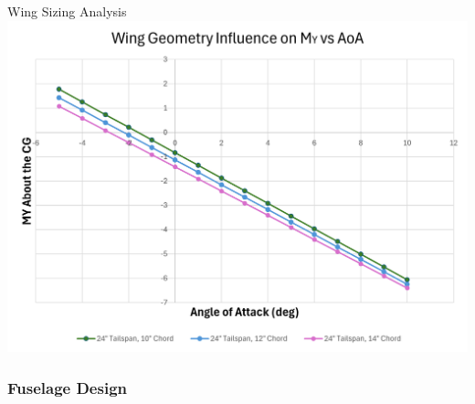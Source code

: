 \documentclass{beamer}
\begin{document}
    



    \begin{frame}{Wing Sizing Analysis}
        \centering
        \includegraphics[width=.9\linewidth]{figures/MyVSAoa.png}
    \end{frame}

    \subsubsection{Fuselage Design}
\end{document}
